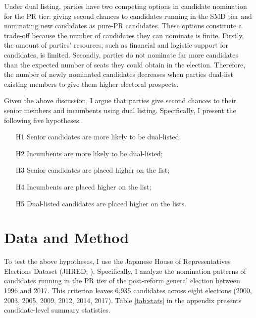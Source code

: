 \documentclass[a4paper, 11pt]{article}
\begin{document}
Under dual listing, parties have two competing options in candidate nomination for the PR tier: giving second chances to candidates running in the SMD tier and nominating new candidates as pure-PR candidates. These options constitute a trade-off because the number of candidates they can nominate is finite. Firstly, the amount of parties' resources, such as financial and logistic support for candidates, is limited. Secondly, parties do not nominate far more candidates than the expected number of seats they could obtain in the election. Therefore, the number of newly nominated candidates decreases when parties dual-list existing members to give them higher electoral prospects. 

Given the above discussion, I argue that parties give second chances to their senior members and incumbents using dual listing. Specifically, I present the following five hypotheses. 

\begin{enumerate}
	\item[H1] Senior candidates are more likely to be dual-listed; 
	\item[H2] Incumbents are more likely to be dual-listed; 
	\item[H3] Senior candidates are placed higher on the list; 
	\item[H4] Incumbents are placed higher on the list; 
	\item[H5] Dual-listed candidates are placed higher on the lists. 
\end{enumerate}

\section{Data and Method} \label{sec: emp}

To test the above hypotheses, I use the Japanese House of Representatives Elections Dataset (JHRED; \citet{reedsmith2018}). Specifically, I analyze the nomination patterns of candidates running in the PR tier of the post-reform general election between 1996 and 2017. This criterion leaves 6,935 candidates across eight elections (2000, 2003, 2005, 2009, 2012, 2014, 2017). Table \ref{tab:stats} in the appendix presents candidate-level summary statistics.
\end{document}
